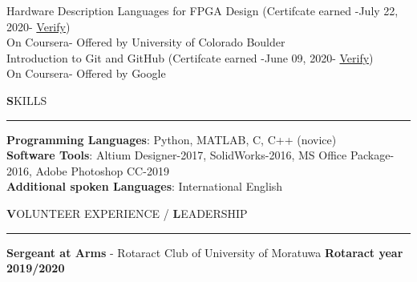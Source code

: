 \documentclass[legalpaper,11pt]{article}
\begin{document}
Hardware Description Languages for FPGA Design \hfill (Certifcate earned -July 22, 2020- \href{https://coursera.org/share/92d9165909e39bee309b138a8faa42d1}{Verify})\\
\hspace{5mm}On Coursera- Offered by University of Colorado Boulder\\

Introduction to Git and GitHub  \hfill (Certifcate earned -June 09, 2020- \href{https://coursera.org/share/11e7ef2a9ae7b3358177c9bb7ad81574}{Verify})\\
\hspace{5mm}On Coursera- Offered by Google

\setlength{\leftskip}{0pt}
\vspace{2cm}



\textbf{\Large S}KILLS

\vspace{2mm}\hrule\vspace{5mm}
\setlength{\leftskip}{5mm}

\textbf{\large Programming Languages}: Python, MATLAB, C, C++ (novice)\\

\textbf{\large Software Tools}: Altium Designer-2017, SolidWorks-2016, MS Office Package-2016, Adobe Photoshop CC-2019\\

\textbf{\large Additional spoken Languages}: International English

\setlength{\leftskip}{0pt}
\vspace{2cm}



\textbf{\Large V}OLUNTEER EXPERIENCE / \textbf{\Large L}EADERSHIP

\vspace{2mm}\hrule\vspace{5mm}
\setlength{\leftskip}{5mm}

\textbf{Sergeant at Arms} - Rotaract Club of University of Moratuwa \hfill\textbf{Rotaract year 2019/2020}\\
\end{document}
